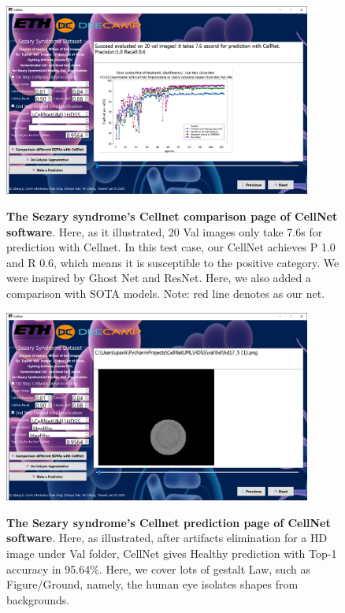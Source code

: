 \begin{figure}[t]
\begin{center}
\includegraphics[height=0.3\textheight,width=0.9\textwidth]{thesis-template-master/images/cellnet5-2page.PNG}
\label{fig:cellnet}
\end{center}
\caption{ \textbf{The Sezary syndrome's Cellnet comparison page of CellNet software}. Here, as it illustrated, 20 Val images only take 7.6s  for prediction with Cellnet. In this test case, our CellNet achieves P 1.0 and R 0.6, which means it is susceptible to the positive category. We were inspired by Ghost Net and ResNet. Here, we also added a comparison with SOTA models. Note: red line denotes as our net. }
\end{figure}

\begin{figure}[t]
\begin{center}
\includegraphics[height=0.3\textheight,width=0.9\textwidth]{thesis-template-master/images/cellnet5-3page.PNG}
\label{fig:cellnet}
\end{center}
\caption{ \textbf{The Sezary syndrome's Cellnet prediction page of CellNet software}. Here, as illustrated, after artifacts elimination for a HD image under Val folder, CellNet gives Healthy prediction with Top-1 accuracy in 95.64\%. Here, we cover lots of gestalt Law, such as Figure/Ground, namely, the human eye isolates shapes from backgrounds.}
\end{figure}


